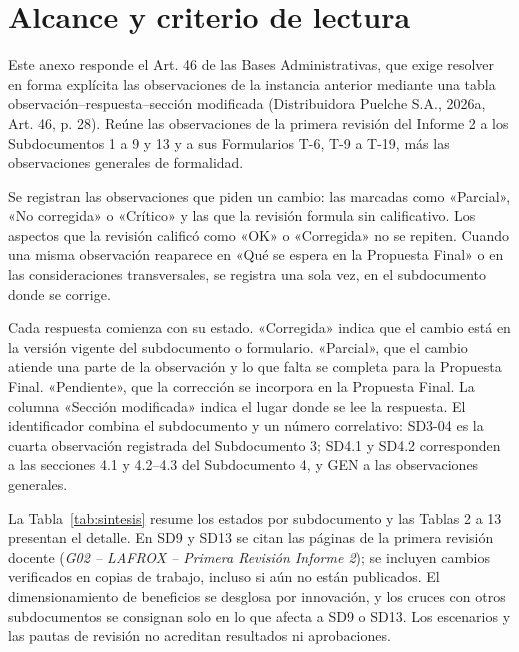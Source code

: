 \documentclass[carta,firma]{lafrox}
\begin{document}
\portadalafrox
\indicelafrox

\section{Alcance y criterio de lectura}

Este anexo responde el Art. 46 de las Bases Administrativas, que exige resolver en forma explícita las observaciones de la instancia anterior mediante una tabla observación–respuesta–sección modificada (Distribuidora Puelche S.A., 2026a, Art. 46, p. 28). Reúne las observaciones de la primera revisión del Informe 2 a los Subdocumentos 1 a 9 y 13 y a sus Formularios T-6, T-9 a T-19, más las observaciones generales de formalidad.

Se registran las observaciones que piden un cambio: las marcadas como «Parcial», «No corregida» o «Crítico» y las que la revisión formula sin calificativo. Los aspectos que la revisión calificó como «OK» o «Corregida» no se repiten. Cuando una misma observación reaparece en «Qué se espera en la Propuesta Final» o en las consideraciones transversales, se registra una sola vez, en el subdocumento donde se corrige.

Cada respuesta comienza con su estado. «Corregida» indica que el cambio está en la versión vigente del subdocumento o formulario. «Parcial», que el cambio atiende una parte de la observación y lo que falta se completa para la Propuesta Final. «Pendiente», que la corrección se incorpora en la Propuesta Final. La columna «Sección modificada» indica el lugar donde se lee la respuesta. El identificador combina el subdocumento y un número correlativo: SD3-04 es la cuarta observación registrada del Subdocumento 3; SD4.1 y SD4.2 corresponden a las secciones 4.1 y 4.2–4.3 del Subdocumento 4, y GEN a las observaciones generales.

La Tabla~\ref{tab:sintesis} resume los estados por subdocumento y las Tablas 2 a 13 presentan el detalle. En SD9 y SD13 se citan las páginas de la primera revisión docente (\emph{G02 -- LAFROX -- Primera Revisión Informe 2}); se incluyen cambios verificados en copias de trabajo, incluso si aún no están publicados. El dimensionamiento de beneficios se desglosa por innovación, y los cruces con otros subdocumentos se consignan solo en lo que afecta a SD9 o SD13. Los escenarios y las pautas de revisión no acreditan resultados ni aprobaciones.


\end{document}
